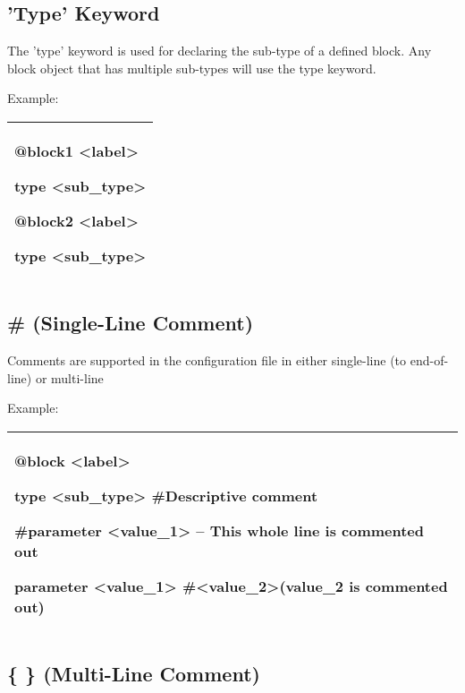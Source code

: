 \documentclass[a4paper,11pt,twoside,pdftex,draft]{article}
\begin{document}
\hypertarget{type-keyword}{%
\subsection{'Type' Keyword}\label{type-keyword}}

The 'type' keyword is used for declaring the sub-type of a defined
block. Any block object that has multiple sub-types will use the type
keyword.

Example:

\begin{longtable}[]{@{}l@{}}
\toprule
\endhead
\begin{minipage}[t]{0.97\columnwidth}\raggedright
@block1 \textless label\textgreater{}

type \textless sub\_type\textgreater{}

@block2 \textless label\textgreater{}

type \textless sub\_type\textgreater{}\strut
\end{minipage}\tabularnewline
\bottomrule
\end{longtable}

\hypertarget{single-line-comment}{%
\subsection{\# (Single-Line Comment)}\label{single-line-comment}}

Comments are supported in the configuration file in either single-line
(to end-of-line) or multi-line

Example:

\begin{longtable}[]{@{}l@{}}
\toprule
\endhead
\begin{minipage}[t]{0.97\columnwidth}\raggedright
@block \textless label\textgreater{}

type \textless sub\_type\textgreater{} \#Descriptive comment

\#parameter \textless value\_1\textgreater{} -- This whole line is
commented out

parameter \textless value\_1\textgreater{}
\#\textless value\_2\textgreater(value\_2 is commented out)\strut
\end{minipage}\tabularnewline
\bottomrule
\end{longtable}

\hypertarget{multi-line-comment}{%
\subsection{\{ \} (Multi-Line Comment)}\label{multi-line-comment}}
\end{document}

